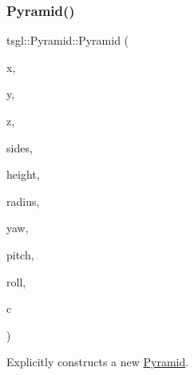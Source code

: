 \subsubsection{\texorpdfstring{Pyramid()}{Pyramid()}\hspace{0.1cm}{\footnotesize\ttfamily [1/2]}}
{\footnotesize\ttfamily tsgl\+::\+Pyramid\+::\+Pyramid (\begin{DoxyParamCaption}\item[{float}]{x,  }\item[{float}]{y,  }\item[{float}]{z,  }\item[{int}]{sides,  }\item[{G\+Lfloat}]{height,  }\item[{G\+Lfloat}]{radius,  }\item[{float}]{yaw,  }\item[{float}]{pitch,  }\item[{float}]{roll,  }\item[{\hyperlink{structtsgl_1_1_color_float}{Color\+Float}}]{c }\end{DoxyParamCaption})}



Explicitly constructs a new \hyperlink{classtsgl_1_1_pyramid}{Pyramid}. 

